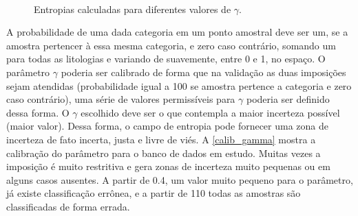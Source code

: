 \begin{figure}[H]
\caption{Entropias calculadas para diferentes valores de $\gamma$.} 
\label{entro_gamma}
\begin{center}
\\
\end{center}
\begin{center}
\end{center}
\end{figure}

A probabilidade de uma dada categoria em um ponto amostral deve ser um, se a amostra pertencer à essa mesma categoria, e zero caso contrário, somando um para todas as litologias e variando de suavemente, entre 0 e 1, no espaço. O parâmetro $\gamma$ poderia ser calibrado de forma que na validação as duas imposições sejam atendidas (probabilidade igual a 100 se amostra pertence a categoria e zero caso contrário), uma série de valores permissíveis para $\gamma$ poderia ser definido dessa forma. O $\gamma$ escolhido deve ser o que contempla a maior incerteza possível (maior valor). Dessa forma, o campo de entropia pode fornecer uma zona de incerteza de fato incerta, justa e livre de viés. A \autoref{calib_gamma} mostra a calibração do parâmetro para o banco de dados em estudo. Muitas vezes a imposição é muito restritiva e gera zonas de incerteza muito pequenas ou em alguns casos ausentes. A partir de 0.4, um valor muito pequeno para o parâmetro, já existe classificação errônea, e a partir de 110 todas as amostras são classificadas de forma errada.

